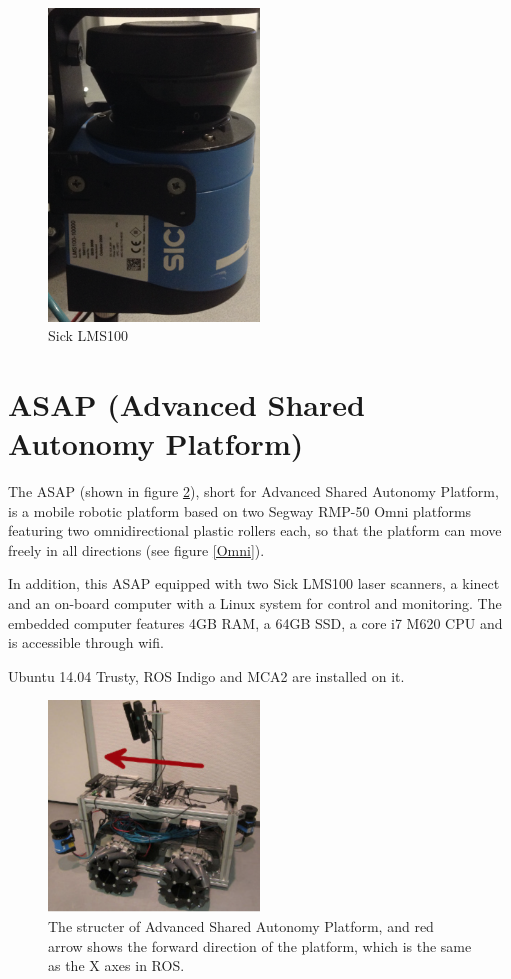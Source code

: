 \begin{figure}[thpb]
      \centering
      \includegraphics[width=0.5\textwidth]{graphics/Laserscanner.png}
      \caption{Sick LMS100}
      \label{Laser}
   \end{figure}
\section{ASAP (Advanced Shared Autonomy Platform)}
The ASAP (shown in figure \ref{ASAP}), short for Advanced Shared Autonomy Platform, is a mobile robotic platform based on two Segway RMP-50 Omni platforms featuring two omnidirectional plastic rollers each, so that the platform can move freely in all directions (see figure \ref{Omni}).

In addition, this ASAP equipped with two Sick LMS100 laser scanners, a kinect and an on-board computer with a Linux system for control and monitoring. The embedded computer features 4GB RAM, a 64GB SSD, a core i7 M620 CPU and is accessible through wifi. 

Ubuntu 14.04 Trusty, ROS Indigo and MCA2 are installed on it.

\begin{figure}[ht]
      \centering
      \includegraphics[width=0.5\textwidth]{graphics/ASAP.png}
      \caption{The structer of Advanced Shared Autonomy Platform, and red arrow shows the forward direction of the platform, which is the same as the X axes in ROS.}
      \label{ASAP}
   \end{figure}

